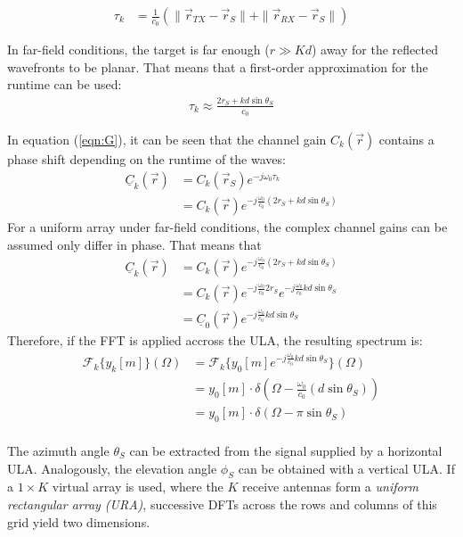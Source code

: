 \begin{align}
    \tau_k & =\frac{1}{c_0} \left( \| \vec r_{TX} - \vec r_S \|+\| \vec r_{RX} - \vec r_S \| \right)
\end{align}

In far-field conditions, the target is far enough ($r \gg K d$) away for the reflected wavefronts to be planar.
That means that a first-order approximation for the runtime can be used:
\begin{align}
    \tau_k \approx \frac{2r_S + kd\sin\theta_S}{c_0}
\end{align}

In equation (\ref{eqn:G}), it can be seen that the channel gain $C_k(\vec r)$
contains a phase shift depending on the runtime of the waves:
\begin{align}
    \underline{C}_k(\vec r) & = C_k(\vec r_S)e^{-j\omega_0\tau_k}                            \\
                            & = C_k(\vec r)e^{-j\frac{\omega_0}{c_0}(2r_S + kd\sin\theta_S)}
\end{align}
For a uniform array under far-field conditions,
the complex channel gains can be assumed only differ in phase. That means that
\begin{align}
    \underline{C}_k(\vec r) & = C_k(\vec r)e^{-j\frac{\omega_0}{c_0}(2r_S + kd\sin\theta_S)}                      \\
                            & = C_k(\vec r)e^{-j\frac{\omega_0}{c_0}2r_S}e^{-j\frac{\omega_0}{c_0}kd\sin\theta_S} \\
                            & = \underline C_0(\vec r)e^{-j\frac{\omega_0}{c_0}kd\sin\theta_S}
\end{align}
Therefore, if the FFT is applied accross the ULA, the resulting spectrum is:
\begin{align}
    \mathcal{F}_k\{y_k[m]\}(\Omega) & = \mathcal{F}_k\{y_0[m]e^{-j \frac{\omega_0}{c_0}kd\sin\theta_S}\}(\Omega)      \\
                                    & = y_0[m] \cdot \delta \left(\Omega -\frac{\omega_0}{c_0}(d\sin\theta_S) \right) \\
                                    & = y_0[m] \cdot \delta \left(\Omega - \pi\sin\theta_S \right)                    \\
\end{align}

The azimuth angle $\theta_S$ can be extracted from the signal supplied by a horizontal ULA.
Analogously, the elevation angle $\phi_S$ can be obtained with a vertical ULA.
If a $1\times K$ virtual array is used, where the $K$ receive antennas form a \emph{uniform rectangular array (URA)},
successive DFTs across the rows and columns of this grid yield two dimensions.

